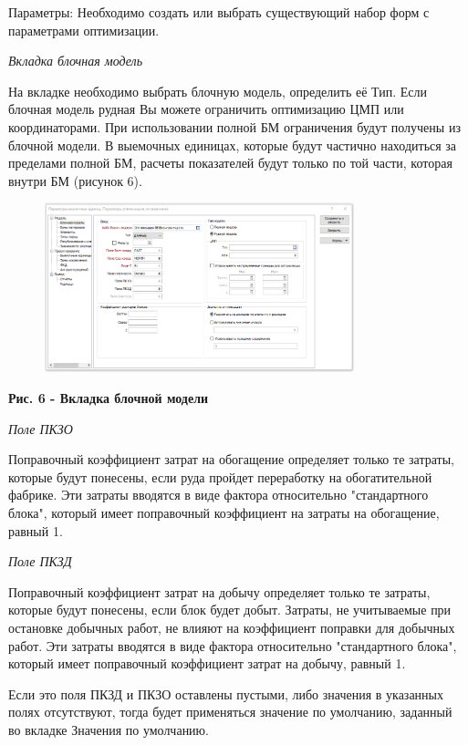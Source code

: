 Параметры: Необходимо создать или выбрать существующий набор форм с
параметрами оптимизации.

\emph{Вкладка блочная модель}

На вкладке необходимо выбрать блочную модель, определить её Тип. Если
блочная модель рудная Вы можете ограничить оптимизацию ЦМП или
координаторами. При использовании полной БМ ограничения будут получены
из блочной модели. В выемочных единицах, которые будут частично
находиться за пределами полной БМ, расчеты показателей будут только по
той части, которая внутри БМ (рисунок 6).

\begin{figure}[H]
	\centering
	\includegraphics[width=0.8\textwidth]{assets/1255}
	\caption*{}
\end{figure}

{\bfseries Рис. 6 - Вкладка блочной модели}

\emph{Поле ПКЗО}

Поправочный коэффициент затрат на обогащение определяет только те
затраты, которые будут понесены, если руда пройдет переработку на
обогатительной фабрике. Эти затраты вводятся в виде фактора относительно
"стандартного блока", который имеет поправочный коэффициент на затраты
на обогащение, равный 1.

\emph{Поле ПКЗД}

Поправочный коэффициент затрат на добычу определяет только те затраты,
которые будут понесены, если блок будет добыт. Затраты, не учитываемые
при остановке добычных работ, не влияют на коэффициент поправки для
добычных работ. Эти затраты вводятся в виде фактора относительно
"стандартного блока", который имеет поправочный коэффициент затрат на
добычу, равный 1.

Если это поля ПКЗД и ПКЗО оставлены пустыми, либо значения в указанных
полях отсутствуют, тогда будет применяться значение по умолчанию,
заданный во вкладке Значения по умолчанию.

